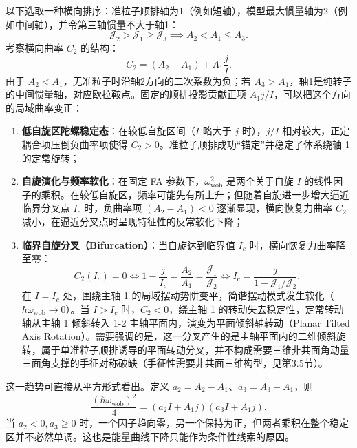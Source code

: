 以下选取一种横向排序：准粒子顺排轴为1（例如短轴），模型最大惯量轴为2（例如中间轴），并令第三轴惯量不大于轴1：
\begin{equation}\label{eq:3-3-TW-condition}
\mathcal{J}_2 > \mathcal{J}_1 \ge \mathcal{J}_3 \implies A_2 < A_1 \le A_3.
\end{equation}
考察横向曲率 $C_2$ 的结构：
\begin{equation}\label{eq:3-3-TW-C2}
C_2 = (A_2 - A_1) + A_1 \frac{j}{I}.
\end{equation}
由于 $A_2<A_1$，无准粒子时沿轴2方向的二次系数为负；若 $A_3>A_1$，轴1是纯转子的中间惯量轴，对应欧拉鞍点。固定的顺排投影贡献正项 $A_1j/I$，可以把这个方向的局域曲率变正：
\begin{enumerate}
\item \textbf{低自旋区陀螺稳定态}：在较低自旋区间（$I$ 略大于 $j$ 时），$j/I$ 相对较大，正定耦合项压倒负曲率项使得 $C_2 > 0$。准粒子顺排成功“锚定”并稳定了体系绕轴 1 的定常旋转；
\item \textbf{自旋演化与频率软化}：在固定 FA 参数下，$\omega_{\text{wob}}^2$ 是两个关于自旋 $I$ 的线性因子的乘积。在较低自旋区，频率可能先有所上升；但随着自旋进一步增大逼近临界分叉点 $I_c$ 时，负曲率项 $(A_2 - A_1) < 0$ 逐渐显现，横向恢复力曲率 $C_2$ 减小，在逼近分叉点时呈现特征性的反常软化下降；
\item \textbf{临界自旋分叉（Bifurcation）}：当自旋达到临界值 $I_c$ 时，横向恢复力曲率降至零：
\begin{equation}\label{eq:3-3-critical-spin}
C_2(I_c) = 0 \iff 1 - \frac{j}{I_c} = \frac{A_2}{A_1} = \frac{\mathcal{J}_1}{\mathcal{J}_2} \iff I_c = \frac{j}{1 - \mathcal{J}_1 / \mathcal{J}_2}.
\end{equation}
在 $I = I_c$ 处，围绕主轴 1 的局域摆动势阱变平，简谐摆动模式发生软化（$\hbar \omega_{\text{wob}} \to 0$）。当 $I > I_c$ 时，$C_2 < 0$，绕主轴 1 的转动失去稳定性，定常转动轴从主轴 1 倾斜转入 1-2 主轴平面内，演变为平面倾斜轴转动（Planar Tilted Axis Rotation）。需要强调的是，这一分叉产生的是主轴平面内的二维倾斜旋转，属于单准粒子顺排诱导的平面转动分叉，并不构成需要三维非共面角动量三面角支撑的手征对称破缺（手征性需要非共面三维构型，见第3.5节）。
\end{enumerate}

这一趋势可直接从平方形式看出。定义 $a_2=A_2-A_1$、$a_3=A_3-A_1$，则
\begin{equation}\label{eq:3-3-frequency-squared-factors}
\frac{(\hbar\omega_{\mathrm{wob}})^2}{4}
=(a_2 I+A_1j)(a_3 I+A_1j).
\end{equation}
当 $a_2<0,a_3\ge0$ 时，一个因子趋向零，另一个保持为正，但两者乘积在整个稳定区并不必然单调。这也是能量曲线下降只能作为条件性线索的原因。

